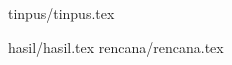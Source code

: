 \documentclass[10pt,twoside]{article}
\begin{document}
  \setcounter{page}{1}

  \setlength{\parindent}{2em}

  \setlength{\parskip}{1ex}


  
\cleardoublepage



 {tinpus/tinpus.tex}

 {hasil/hasil.tex}
 {rencana/rencana.tex}
 \renewcommand\refname{DAFTAR PUSTAKA}
 
 
 \cleardoublepage
\end{document}

